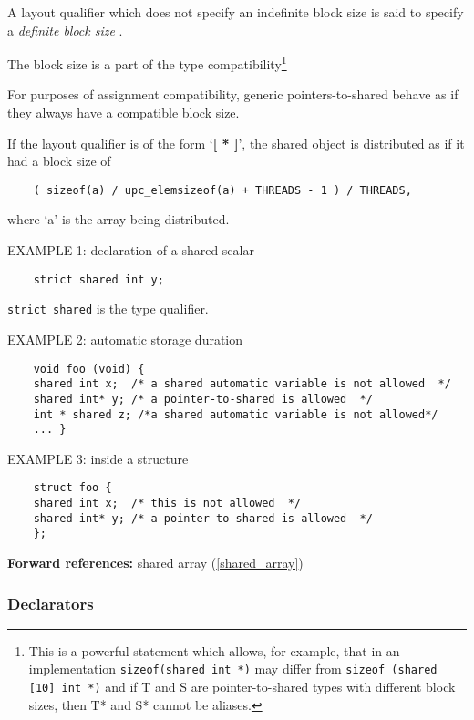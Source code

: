 \np A layout qualifier which does not specify an indefinite
    block size is said to specify a {\em definite block size} .

\np The block size is a part of the type
    compatibility\footnote{This is a powerful statement which allows,
    for example, that in an implementation {\tt sizeof(shared int *)}
    may differ from {\tt sizeof (shared [10] int *)} and if T and S
    are pointer-to-shared types with different block sizes, then T* and S*
    cannot be aliases.}

\np For purposes of assignment compatibility, generic pointers-to-shared
    behave as if they always have a compatible block size.
        
\np If the layout qualifier is of the form `{\bf [ * ]}',
    the shared object is distributed as if it had a block size of

\begin{verbatim}
    ( sizeof(a) / upc_elemsizeof(a) + THREADS - 1 ) / THREADS, 
\end{verbatim}

    where `a' is the array being distributed. 

\np EXAMPLE 1: declaration of a shared scalar 

\begin{verbatim}
    strict shared int y;
\end{verbatim}

    {\tt strict shared} is the type qualifier.

\np EXAMPLE 2: automatic storage duration 

\begin{verbatim}
    void foo (void) { 
    shared int x;  /* a shared automatic variable is not allowed  */ 
    shared int* y; /* a pointer-to-shared is allowed  */ 
    int * shared z; /*a shared automatic variable is not allowed*/ 
    ... } 
\end{verbatim}

\np EXAMPLE 3: inside a structure  

\begin{verbatim}
    struct foo { 
    shared int x;  /* this is not allowed  */ 
    shared int* y; /* a pointer-to-shared is allowed  */ 
    }; 
\end{verbatim}

{\bf Forward references:} shared array (\ref{shared_array})
\subsubsection{Declarators}
\label{declarator}

